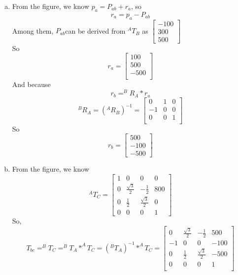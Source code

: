 \begin{enumerate}[(a)]
    \item 
    From the figure, we know \(p_a = P_{ab} + r_a\), so\[r_a = p_a - P_{ab}\]
    Among them, \(P_{ab}\)can be derived from \(^AT_B\) as \(\begin{bmatrix} -100\\300\\500 \end{bmatrix}\)\\
    So \[r_a = \begin{bmatrix}100\\500\\-500 \\ \end{bmatrix}\]
    And because
    \[r_b = ^BR_A*r_a\]
    \[^BR_A={(^AR_B)}^{-1}= \begin{bmatrix} 0 & 1 & 0  \\ -1 & 0 & 0  \\ 0 & 0 & 1 \\ \end{bmatrix}\]
    So \[r_b = \begin{bmatrix}
        500 \\ -100 \\ -500
    \end{bmatrix}\]
    \item 
    From the figure, we know \[^AT_C = \begin{bmatrix}
        1 & 0 & 0 & 0\\
        0 & \frac{\sqrt{3}}{2} & -\frac{1}{2} & 800\\
        0 & \frac{1}{2} & \frac{\sqrt{3}}{2} & 0\\
        0 & 0 & 0 & 1
    \end{bmatrix}\]
    So, \[T_{bc} = ^BT_C = ^BT_A * ^AT_C = (^BT_A)^{-1} * ^AT_C = \begin{bmatrix}
        0 & \frac{\sqrt{3}}{2} & -\frac{1}{2} & 500\\
        -1 & 0 & 0 & -100 \\
        0 & \frac12 & \frac{\sqrt{3}}{2} & -500 \\
        0 & 0 & 0 & 1\\
    \end{bmatrix}\]
\end{enumerate}
